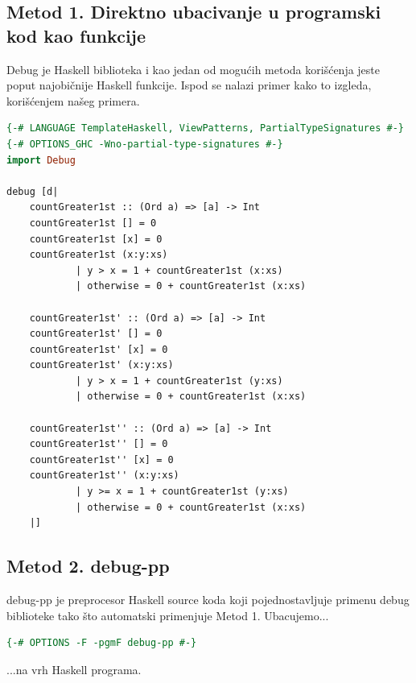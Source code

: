 \documentclass[a4paper]{article}
\begin{document}
\subsection{Metod 1. Direktno ubacivanje u programski kod kao funkcije}
Debug je Haskell biblioteka i kao jedan od mogućih metoda korišćenja jeste poput najobičnije Haskell funkcije. Ispod se nalazi primer kako to izgleda, korišćenjem našeg primera. 
\begin{lstlisting}[caption={Okružujemo naš kod funkcijom debug, iz biblioteke Debug, sa uključivanjem ekstenzija navedenih u prvom redu}, language=Haskell]
{-# LANGUAGE TemplateHaskell, ViewPatterns, PartialTypeSignatures #-}
{-# OPTIONS_GHC -Wno-partial-type-signatures #-}
import Debug

debug [d|
    countGreater1st :: (Ord a) => [a] -> Int
    countGreater1st [] = 0
    countGreater1st [x] = 0
    countGreater1st (x:y:xs) 
            | y > x = 1 + countGreater1st (x:xs)
            | otherwise = 0 + countGreater1st (x:xs)
    
    countGreater1st' :: (Ord a) => [a] -> Int
    countGreater1st' [] = 0
    countGreater1st' [x] = 0
    countGreater1st' (x:y:xs) 
            | y > x = 1 + countGreater1st (y:xs)
            | otherwise = 0 + countGreater1st (x:xs)

    countGreater1st'' :: (Ord a) => [a] -> Int
    countGreater1st'' [] = 0
    countGreater1st'' [x] = 0
    countGreater1st'' (x:y:xs) 
            | y >= x = 1 + countGreater1st (y:xs)
            | otherwise = 0 + countGreater1st (x:xs)
    |]
\end{lstlisting}

\subsection{Metod 2. debug-pp}
debug-pp je preprocesor Haskell source koda koji pojednostavljuje primenu debug biblioteke tako što automatski primenjuje Metod 1. Ubacujemo...
\begin{lstlisting}[language=Haskell]
{-# OPTIONS -F -pgmF debug-pp #-}
\end{lstlisting}
...na vrh Haskell programa.
\end{document}
